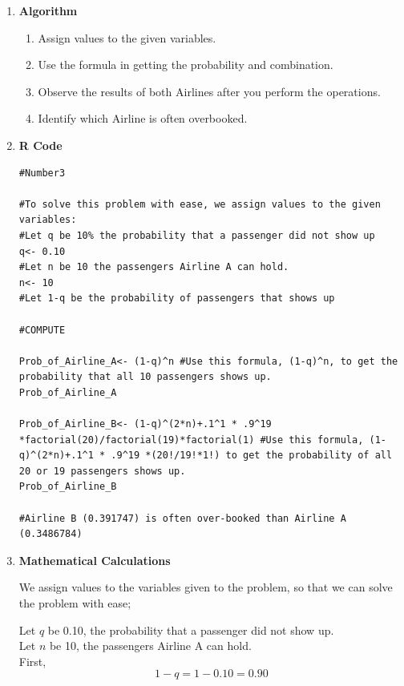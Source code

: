 \documentclass[12pt,letterpaper]{article}
\begin{document}
    \hspace*{0.5cm} \vspace*{0.5cm}
    \begin{enumerate}[label=\Alph*]
      \item \textbf{Algorithm}
      
        \begin{enumerate}[label=\arabic*.]
          \item Assign values to the given variables.
          \item Use the formula in getting the probability and combination.
          \item Observe the results of both Airlines after you perform the operations.
          \item Identify which Airline is often overbooked.
        \end{enumerate}

      \vspace*{0.5cm}
      \item \textbf{R Code}
      
        \begin{lstlisting}
#Number3

#To solve this problem with ease, we assign values to the given variables:
#Let q be 10% the probability that a passenger did not show up
q<- 0.10
#Let n be 10 the passengers Airline A can hold.
n<- 10
#Let 1-q be the probability of passengers that shows up 

#COMPUTE

Prob_of_Airline_A<- (1-q)^n #Use this formula, (1-q)^n, to get the probability that all 10 passengers shows up.
Prob_of_Airline_A

Prob_of_Airline_B<- (1-q)^(2*n)+.1^1 * .9^19 *factorial(20)/factorial(19)*factorial(1) #Use this formula, (1-q)^(2*n)+.1^1 * .9^19 *(20!/19!*1!) to get the probability of all 20 or 19 passengers shows up.  
Prob_of_Airline_B

#Airline B (0.391747) is often over-booked than Airline A (0.3486784)
        \end{lstlisting}

      \vspace*{0.5cm}
      \item \textbf{Mathematical Calculations}
      
        We assign values to the variables given to the problem, so that we can solve the problem with ease;

        \hspace*{0.5cm} Let $q$ be 0.10, the probability that a passenger did not show up.\\
        \hspace*{0.5cm} Let $n$ be 10, the passengers Airline A can hold.\\
        First,
        \begin{equation*}
          1-q=1-0.10=0.90
        \end{equation*}


\end{enumerate}
\end{document}
